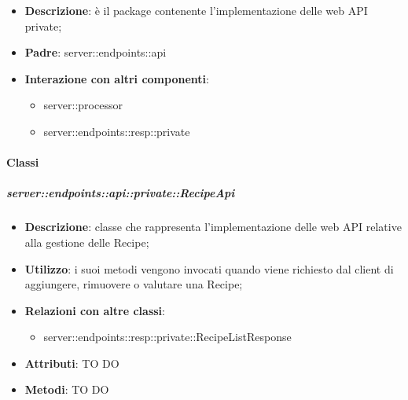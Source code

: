 \begin{itemize}
  \item \textbf{Descrizione}: è il package contenente l'implementazione delle web API private;
  \item \textbf{Padre}: server::endpoints::api
  \item \textbf{Interazione con altri componenti}:
  	\begin{itemize}
        \item server::processor
				\item server::endpoints::resp::private
    \end{itemize}
\end{itemize}

	\paragraph{Classi} %

    \subparagraph{server::endpoints::api::private::RecipeApi} %
    \label{subp:bdsm_app_server_endpoints_api_private_recipeapi}
    \begin{itemize}
      \item \textbf{Descrizione}: classe che rappresenta l'implementazione delle web API relative alla gestione delle Recipe;
      \item \textbf{Utilizzo}: i suoi metodi vengono invocati quando viene richiesto dal client di aggiungere, rimuovere o valutare una Recipe;
      \item \textbf{Relazioni con altre classi}:
        \begin{itemize}
          \item server::endpoints::resp::private::RecipeListResponse
        \end{itemize}
		\item \textbf{Attributi}: TO DO
		\item \textbf{Metodi}: TO DO
      \end{itemize}

